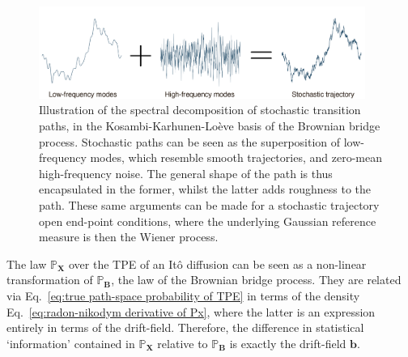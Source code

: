 \begin{figure}[t]
\includegraphics[width=0.95\textwidth]{figs_part1/mcmc/rough_path_decomposition}
\centering \caption{Illustration of the spectral decomposition of stochastic transition paths, in the Kosambi-Karhunen-Lo\`eve basis of the Brownian bridge process. Stochastic paths can be seen as the superposition of low-frequency modes, which resemble smooth trajectories, and zero-mean high-frequency noise. The general shape of the path is thus encapsulated in the former, whilst the latter adds roughness to the path. These same arguments can be made for a stochastic trajectory open end-point conditions, where the underlying Gaussian reference measure is then the Wiener process.}
\label{fig:rough path decomposition} 
\end{figure}

The law $\mathbb{P}_\mathbf{X}$ over the TPE of an It\^{o} diffusion can be seen as a non-linear transformation of $\mathbb{P}_\mathbf{B}$, the law of the Brownian bridge process. They are related via Eq.~\ref{eq:true path-space probability of TPE} in terms of the density Eq.~\ref{eq:radon-nikodym derivative of Px}, where the latter is an expression entirely in terms of the drift-field. Therefore, the difference in statistical `information' contained in $\mathbb{P}_\mathbf{X}$ relative to $\mathbb{P}_\mathbf{B}$ is exactly the drift-field $\mathbf{b}$. 

